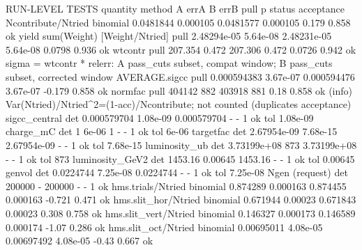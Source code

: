 \begin{simcshell}[basicstyle=\ttfamily\tiny]
{RUN-LEVEL TESTS
quantity                                      method                   A       errA             B       errB     pull          p  status
acceptance Ncontribute/Ntried                 binomial         0.0481844   0.000105     0.0481577   0.000105    0.179      0.858  ok
yield sum(Weight) [Weight/Ntried]             pull           2.48294e-05   5.64e-08   2.48231e-05   5.64e-08   0.0798      0.936  ok
wtcontr                                       pull               207.354      0.472       207.306      0.472   0.0726      0.942  ok  sigma = wtcontr * relerr: A pass_cuts subset, compat window; B pass_cuts subset, corrected window
AVERAGE.sigcc                                 pull           0.000594383   3.67e-07   0.000594476   3.67e-07   -0.179      0.858  ok
normfac                                       pull                404142        882        403918        881     0.18      0.858  ok (info)  Var(Ntried)/Ntried^2=(1-acc)/Ncontribute; not counted (duplicates acceptance)
sigcc_central                                 det            0.000579704   1.08e-09   0.000579704          -        -          1  ok  tol 1.08e-09
charge_mC                                     det                      1      6e-06             1          -        -          1  ok  tol 6e-06
targetfac                                     det            2.67954e-09   7.68e-15   2.67954e-09          -        -          1  ok  tol 7.68e-15
luminosity_ub                                 det            3.73199e+08        873   3.73199e+08          -        -          1  ok  tol 873
luminosity_GeV2                               det                1453.16    0.00645       1453.16          -        -          1  ok  tol 0.00645
genvol                                        det              0.0224744   7.25e-08     0.0224744          -        -          1  ok  tol 7.25e-08
Ngen (request)                                det                 200000          -        200000          -        -          1  ok
hms.trials/Ntried                             binomial          0.874289   0.000163      0.874455   0.000163   -0.721      0.471  ok
hms.slit_hor/Ntried                           binomial          0.671944    0.00023      0.671843    0.00023    0.308      0.758  ok
hms.slit_vert/Ntried                          binomial          0.146327   0.000173      0.146589   0.000174    -1.07      0.286  ok
hms.slit_oct/Ntried                           binomial        0.00695011   4.08e-05    0.00697492   4.08e-05    -0.43      0.667  ok

}
\end{simcshell}
